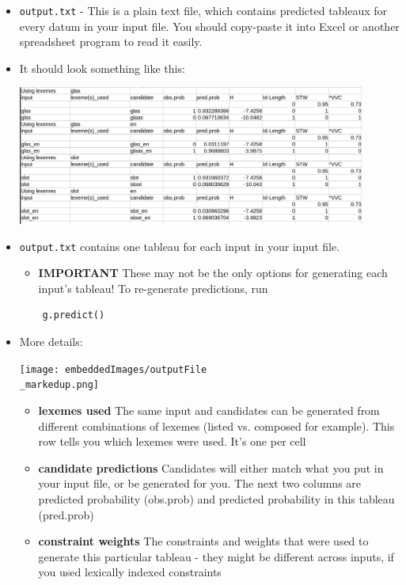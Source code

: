 \documentclass[12]{article}
\begin{document}
\begin{itemize}
	\item \texttt{output.txt} - This is a plain text file, which contains predicted tableaux for every datum in your input file.  You should copy-paste it into Excel or another spreadsheet program to read it easily.
	\item[] It should look something like this:

\includegraphics[width=0.9\textwidth]{embeddedImages/outputFile.png}

	\item[] \texttt{output.txt} contains one tableau for each input in your input file.
	\begin{itemize}
		\item[] {\bf IMPORTANT} These may not be the only options for generating each input's tableau!  To re-generate predictions, run
	\end{itemize}

\begin{verbatim}
	g.predict()
\end{verbatim}


	\item[] More details:
	
\texttt{[image: embeddedImages/outputFile\\\_markedup.png]}
	\begin{itemize}
		\item[] {\bf lexemes used} The same input and candidates can be generated from different combinations of lexemes (listed vs. composed for example).  This row tells you which lexemes were used.  It's one per cell
		\item[] {\bf candidate predictions} Candidates will either match what you put in your input file, or be generated for you.  The next two columns are predicted probability (obs.prob) and predicted probability in this tableau (pred.prob)
		\item[] {\bf constraint weights} The constraints and weights that were used to generate this particular tableau - they might be different across inputs, if you used lexically indexed constraints
	\end{itemize}



\end{itemize}
\end{document}
